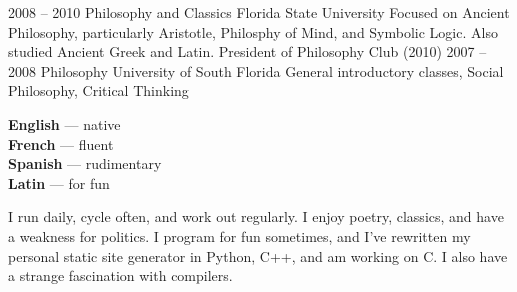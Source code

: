 \documentclass[9pt]{developercv} %
\begin{document}
\begin{entrylist}
    \entry
    {2008 -- 2010}
    {Philosophy and Classics}
    {Florida State University}
    {Focused on Ancient Philosophy, particularly Aristotle, Philosphy of
        Mind, and Symbolic Logic. Also studied Ancient Greek and Latin.
    President of Philosophy Club (2010)}
    \entry
    {2007 -- 2008}
    {Philosophy}
    {University of South Florida}
    {General introductory classes, Social Philosophy, Critical Thinking}
\end{entrylist}

%
\begin{minipage}[t]{0.3\textwidth}
    \vspace{-\baselineskip} %


    \textbf{English} --- native\\
    \textbf{French} --- fluent\\
    \textbf{Spanish} --- rudimentary\\
    \textbf{Latin} --- for fun

\end{minipage}
\hfill
\begin{minipage}[t]{0.7\textwidth}
    \vspace{-\baselineskip} %

    I run daily, cycle often, and work out regularly. I enjoy poetry, classics, and
    have a weakness for politics. I program for fun sometimes, and I've rewritten
    my personal static site generator in Python, C++, and am working on C. I also
    have a strange fascination with compilers.
\end{minipage}
%
%

\end{document}
